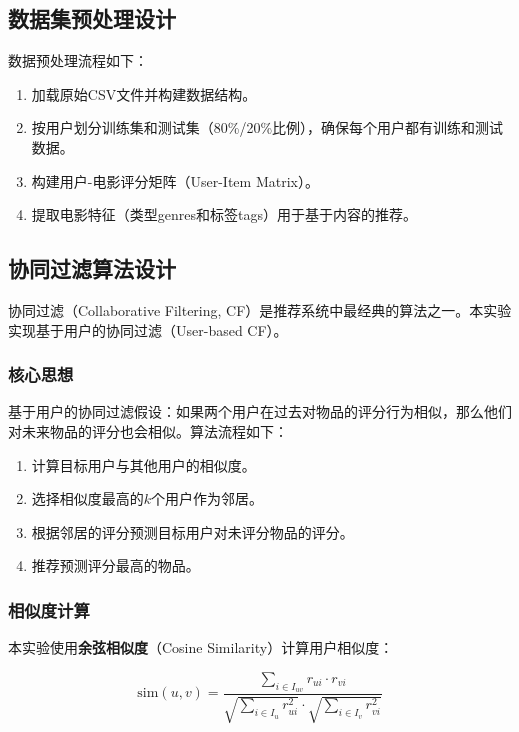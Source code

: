 \documentclass[a4paper]{article}
\begin{document}
\subsection{数据集预处理设计}
数据预处理流程如下：
\begin{enumerate}
    \item 加载原始CSV文件并构建数据结构。
    \item 按用户划分训练集和测试集（80\%/20\%比例），确保每个用户都有训练和测试数据。
    \item 构建用户-电影评分矩阵（User-Item Matrix）。
    \item 提取电影特征（类型genres和标签tags）用于基于内容的推荐。
\end{enumerate}

\subsection{协同过滤算法设计}

协同过滤（Collaborative Filtering, CF）是推荐系统中最经典的算法之一。本实验实现基于用户的协同过滤（User-based CF）。

\subsubsection{核心思想}

基于用户的协同过滤假设：如果两个用户在过去对物品的评分行为相似，那么他们对未来物品的评分也会相似。算法流程如下：
\begin{enumerate}
    \item 计算目标用户与其他用户的相似度。
    \item 选择相似度最高的$k$个用户作为邻居。
    \item 根据邻居的评分预测目标用户对未评分物品的评分。
    \item 推荐预测评分最高的物品。
\end{enumerate}

\subsubsection{相似度计算}

本实验使用\textbf{余弦相似度}（Cosine Similarity）计算用户相似度：

\begin{equation}
\text{sim}(u, v) = \frac{\sum_{i \in I_{uv}} r_{ui} \cdot r_{vi}}{\sqrt{\sum_{i \in I_u} r_{ui}^2} \cdot \sqrt{\sum_{i \in I_v} r_{vi}^2}}
\end{equation}
\end{document}
